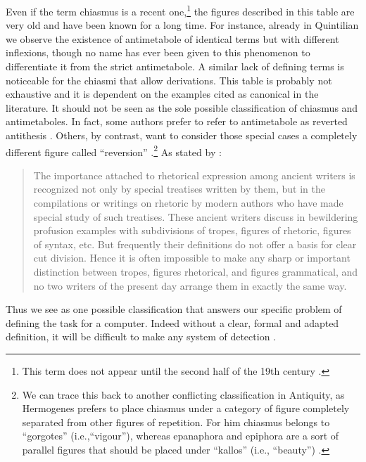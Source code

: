 \setcounter{footnote}{5}


 Even if the term chiasmus is a recent one,\footnote{This term does not appear until the second half of the 19th century \cite[p. 24]{horvei1985}.} the figures described in this table are very old and have been known for a long time. For instance, already in Quintilian we observe the existence of antimetabole of identical terms but with different inflexions, though no name has ever been given to this phenomenon to differentiate it from the strict antimetabole. A similar lack of defining terms is noticeable for the chiasmi that allow derivations.
 This table is probably not exhaustive and it is dependent on the examples cited as canonical in the literature. It should not be seen as the sole possible classification of chiasmus and antimetaboles. In fact, some authors prefer to refer to antimetabole as reverted antithesis \citep{Viklund2002}. Others, by contrast, want to consider those special cases a completely different figure called ``reversion'' \cite[Art. Reversion]{font}.\footnote{We can trace this back to another conflicting classification in Antiquity, as Hermogenes prefers to place chiasmus under a category of figure completely separated from other figures of repetition. For him chiasmus belongs to ``gorgotes'' (i.e.,``vigour''), whereas epanaphora and epiphora are a sort of parallel figures that should be placed under ``kallos'' (i.e., ``beauty'') \citep{Wooten2012}.}   
 As stated by \cite[p. 3]{Watson1912}:
\begin{quotation}
 The importance attached to rhetorical expression among ancient writers is recognized not only by special treatises written by them, but in the compilations or writings on rhetoric by modern authors who have made special study of such treatises. These ancient writers discuss in bewildering profusion examples with subdivisions of tropes, figures of rhetoric, figures of syntax, etc. But frequently their definitions do not offer a basis for clear cut division. Hence it is often impossible to make any sharp or important distinction between tropes, figures rhetorical, and figures grammatical, and no two writers of the present day arrange them in exactly the same way.
\end{quotation}
\noindent
 Thus we see  as one possible classification that answers our specific problem of defining the task for a computer. %
 Indeed without a clear, formal and adapted definition, it will be difficult to make any system of detection \cite[p. 67]{gawr}.
 
